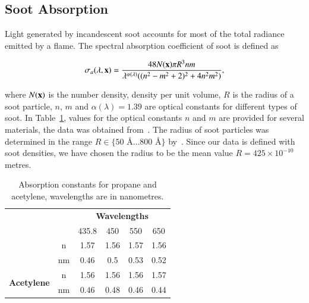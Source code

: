 \subsection{Soot Absorption}
\label{sec:soot_absorption}

Light generated by incandescent soot accounts for most of the total radiance emitted by a flame. 
The spectral absorption coefficient of soot is defined as

\begin{equation}
\sigma_a(\lambda, \mathbf{x}) = \frac{48 N(\mathbf{x}) \pi R^3 n m}{\lambda^{\alpha(\lambda)} ((n^2 - m^2 +2)^2 + 4 n^2 m^2)},
\end{equation}

where $N(\mathbf{x})$ is the number density, density per unit volume, $R$ is the radius of a soot particle, $n$, $m$ and $\alpha(\lambda) = 1.39$ are optical constants for different types of soot.
In Table~\ref{tb:soot_absorption_coefficients}, values for the optical constants $n$ and $m$ are provided for several materials, the data was obtained from~\cite{Dalzell:1969}.
The radius of soot particles was determined in the range $R \in \lbrace 50\mbox{~\AA} \ldots 800\mbox{~\AA} \rbrace $ by~\cite{Dalzell:1969}.
Since our data is defined with soot densities, we have chosen the radius to be the mean value $R = 425 \times 10^{-10}$ metres.

\begin{table}[htbp!]
\centering
\caption{Absorption constants for propane and acetylene, wavelengths are in nanometres.}
\label{tb:soot_absorption_coefficients}
\begin{tabular}{cc|c|c|c|c|}
\cline{3-6}
                                                 &    & \multicolumn{4}{c|}{\textbf{Wavelengths}} \\ \cline{3-6} 
                                                 &    & 435.8   & 450    & 550   & 650   \\ \hhline{--|=|=|=|=|}
\multicolumn{1}{|c|}{\multirow{2}{*}{\textbf{Propane}}}   & \multicolumn{1}{c||}{n}  & 1.57    & 1.56   & 1.57  & 1.56  \\ \cline{2-6} 
\multicolumn{1}{|c|}{}                           & \multicolumn{1}{c||}{nm} & 0.46    & 0.5    & 0.53  & 0.52  \\ \hline
\multicolumn{1}{|c|}{\multirow{2}{*}{\textbf{Acetylene}}} & \multicolumn{1}{c||}{n}  & 1.56    & 1.56   & 1.56  & 1.57  \\ \cline{2-6} 
\multicolumn{1}{|c|}{}                           & \multicolumn{1}{c||}{nm} & 0.46    & 0.48   & 0.46  & 0.44  \\ \hline
\end{tabular}
\end{table}

